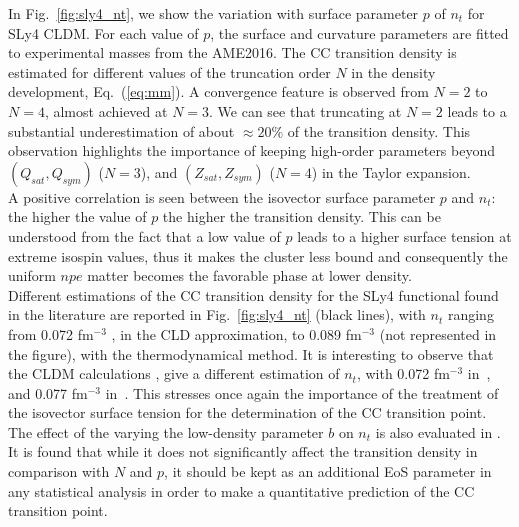 In Fig.~\ref{fig:sly4_nt}, we show the variation with surface parameter $p$ of 
$n_t$ for SLy4 CLDM. For each value of $p$, the surface and curvature 
parameters are fitted to experimental masses from the AME2016. 
The CC transition density is estimated for different 
values of the truncation order $N$ in the density development, 
Eq.~(\ref{eq:mm}). A convergence feature is observed from $N=2$ to $N=4$,
almost achieved at $N=3$. We can see that truncating at $N=2$ leads to a 
substantial underestimation of about $\approx 20\%$ of the transition density. 
This observation highlights the importance of keeping high-order 
parameters beyond $(Q_{sat},Q_{sym})$ ($N=3$), and $(Z_{sat},Z_{sym})$ ($N=4$)
in the Taylor expansion.\\
A positive correlation is seen between the isovector surface parameter $p$ and 
$n_t$: the higher the value of $p$ the higher the transition density. This can 
be understood from the fact that a low value of $p$ leads to a higher surface 
tension at extreme isospin values, thus it makes the cluster less bound and
consequently the uniform ${npe}$ matter becomes the favorable phase at lower
density.\\
Different estimations of the CC transition density for the SLy4 functional
found in the literature are reported in Fig.~\ref{fig:sly4_nt} (black lines), 
with $n_t$ ranging from 0.072 fm$^{-3}$ \cite{Vinas2017}, in the 
CLD approximation, to 0.089 fm$^{-3}$ \cite{Ducoin2011} (not represented in the 
figure), with the thermodynamical method. It is interesting to observe that 
the  CLDM calculations , give a different estimation of 
$n_t$, with 0.072 fm$^{-3}$ in~\cite{Vinas2017}, and 0.077 fm$^{-3}$ 
in~\cite{Douchin2000a}. This stresses once again the importance of the 
treatment of the isovector surface tension for the determination of the CC 
transition point.\\
The effect of the varying the low-density parameter $b$ on $n_t$ is also 
evaluated in \cite{Carreau2019cc}. It is found that while it does not 
significantly affect the transition density in comparison with $N$ and $p$, it 
should be kept as an additional EoS parameter in any statistical analysis in
order to make a quantitative prediction of the CC transition point.

